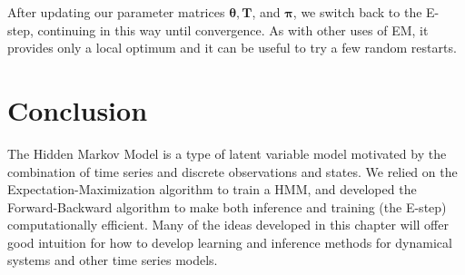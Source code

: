 After updating our parameter matrices $\boldsymbol{\theta}, \textbf{T}$, and $\boldsymbol{\pi}$, we switch back to the E-step, continuing in this way until convergence. As with other uses of EM, it provides only a local optimum and it can be useful to try a few random restarts.


\section{Conclusion}

The Hidden Markov Model is a type of latent variable model motivated by the combination of time series and discrete observations and states.  We relied on the Expectation-Maximization algorithm to train a HMM, and developed the Forward-Backward algorithm to make both inference and training (the E-step) computationally
efficient. Many of the ideas developed in this chapter will offer good intuition for how to develop learning and inference methods for dynamical systems and other time series models.
